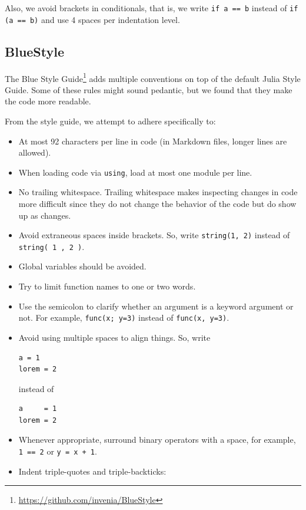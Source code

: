 \documentclass[
  notoc %
]{tufte-book}
\DeclareRobustCommand{\href}[2]{#2\footnote{\url{#1}}}
\newcommand{\passthrough}[1]{#1}
\begin{document}
Also, we avoid brackets in conditionals, that is, we write
\passthrough{\lstinline!if a == b!} instead of
\passthrough{\lstinline!if (a == b)!} and use 4 spaces per indentation
level.

\hypertarget{bluestyle}{%
\subsection{BlueStyle}\label{bluestyle}}

The \href{https://github.com/invenia/BlueStyle}{Blue Style Guide} adds
multiple conventions on top of the default Julia Style Guide. Some of
these rules might sound pedantic, but we found that they make the code
more readable.

From the style guide, we attempt to adhere specifically to:

\begin{itemize}
\item
  At most 92 characters per line in code (in Markdown files, longer
  lines are allowed).
\item
  When loading code via \passthrough{\lstinline!using!}, load at most
  one module per line.
\item
  No trailing whitespace. Trailing whitespace makes inspecting changes
  in code more difficult since they do not change the behavior of the
  code but do show up as changes.
\item
  Avoid extraneous spaces inside brackets. So, write
  \passthrough{\lstinline!string(1, 2)!} instead of
  \passthrough{\lstinline!string( 1 , 2 )!}.
\item
  Global variables should be avoided.
\item
  Try to limit function names to one or two words.
\item
  Use the semicolon to clarify whether an argument is a keyword argument
  or not. For example, \passthrough{\lstinline!func(x; y=3)!} instead of
  \passthrough{\lstinline!func(x, y=3)!}.
\item
  Avoid using multiple spaces to align things. So, write

\begin{lstlisting}
a = 1
lorem = 2
\end{lstlisting}

  instead of

\begin{lstlisting}
a     = 1
lorem = 2
\end{lstlisting}
\item
  Whenever appropriate, surround binary operators with a space, for
  example, \passthrough{\lstinline!1 == 2!} or
  \passthrough{\lstinline!y = x + 1!}.
\item
  Indent triple-quotes and triple-backticks:


\end{itemize}
\end{document}
